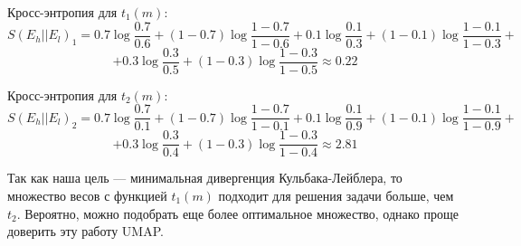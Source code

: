 Кросс-энтропия для $t_1(m)$:
\[S(E_h||E_l)_1 = 0.7\log \frac{0.7}{0.6} + (1-0.7)\log \frac{1-0.7}{1-0.6} + 0.1\log \frac{0.1}{0.3} + (1-0.1)\log \frac{1-0.1}{1-0.3}+\] \[+ 0.3\log \frac{0.3}{0.5} + (1-0.3)\log \frac{1-0.3}{1-0.5} \approx 0.22\]

Кросс-энтропия для $t_2(m)$:
\[S(E_h||E_l)_2 = 0.7\log \frac{0.7}{0.1} + (1-0.7)\log \frac{1-0.7}{1-0.1} + 0.1\log \frac{0.1}{0.9} + (1-0.1)\log \frac{1-0.1}{1-0.9} +\]\[+ 0.3\log \frac{0.3}{0.4} + (1-0.3)\log \frac{1-0.3}{1-0.4} \approx 2.81\]

Так как наша цель --- минимальная дивергенция Кульбака-Лейблера, то множество весов с функцией $t_1(m)$ подходит для решения задачи больше, чем $t_2$. Вероятно, можно подобрать еще более оптимальное множество, однако проще доверить эту работу UMAP.